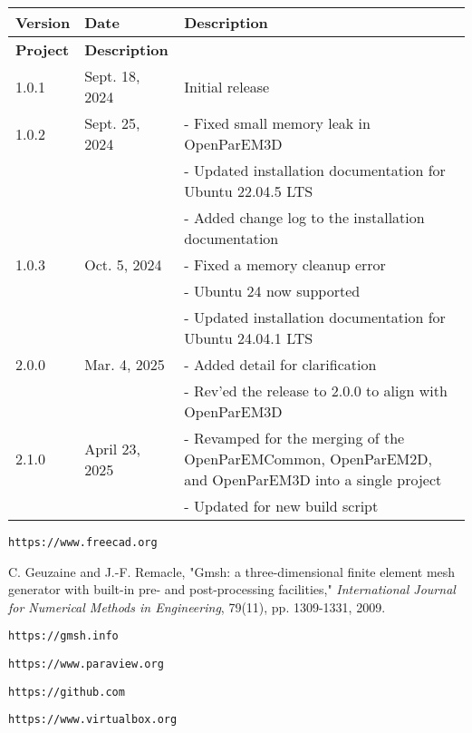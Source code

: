 \documentclass[titlepage]{article}
\renewcommand\_{\textunderscore\linebreak[1]}
\begin{document}
\tabcolsep=0.1cm
\small
\begin{longtable}[c]{|p{1.5cm}p{3cm}p{11cm}|}
    \hline
    \textbf{Version} & \textbf{Date} & Description \\
    \hline
    \endfirsthead
    \hline
    \textbf{Project} & \textbf{Description} \\
    \hline
    \endhead
   1.0.1 & Sept. 18, 2024 & Initial release \\
   1.0.2 & Sept. 25, 2024 & - Fixed small memory leak in OpenParEM3D \\
         &                & - Updated installation documentation for Ubuntu 22.04.5 LTS \\
         &                & - Added change log to the installation documentation \\
   1.0.3 & Oct. 5, 2024   & - Fixed a memory cleanup error \\
         &                & - Ubuntu 24 now supported \\
         &                & - Updated installation documentation for Ubuntu 24.04.1 LTS \\
   2.0.0 & Mar. 4, 2025   & - Added detail for clarification \\
         &                & - Rev'ed the release to 2.0.0 to align with OpenParEM3D \\
   2.1.0 & April 23, 2025   & - Revamped for the merging of the OpenParEMCommon, OpenParEM2D, and OpenParEM3D into a single project \\
         &                & - Updated for new build script \\
    \hline
\end{longtable}

\begin{thebibliography}{unsrt}

 \verb+https://www.freecad.org+

 C. Geuzaine and J.-F. Remacle, "Gmsh: a three-dimensional finite element mesh generator with built-in pre- and post-processing facilities," \textit{International Journal for Numerical Methods in Engineering}, 79(11), pp. 1309-1331, 2009.

 \verb+https://gmsh.info+

 \verb+https://www.paraview.org+

 \verb+https://github.com+

 \verb+https://www.virtualbox.org+

\end{thebibliography}
\end{document}
